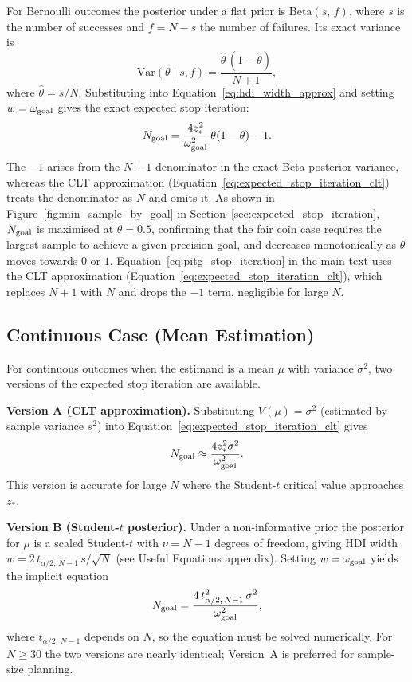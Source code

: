For Bernoulli outcomes the posterior under a flat prior is $\mathrm{Beta}(s,\,f)$,
where $s$ is the number of successes and $f = N - s$ the number of failures.
Its exact variance is
\[
\mathrm{Var}(\theta \mid s, f) = \frac{\hat\theta\,(1-\hat\theta)}{N+1},
\]
where $\hat\theta = s/N$. Substituting into Equation~\ref{eq:hdi_width_approx}
and setting $w = \omega_{\rm goal}$ gives the exact expected stop iteration:
\begin{equation}\label{eq:expected_stop_iteration_binomial}
N_{\rm goal} = \frac{4 z_{*}^{2}}{\omega_{\rm goal}^{2}}\,\theta(1-\theta) - 1.
\end{equation}
The $-1$ arises from the $N+1$ denominator in the exact Beta posterior variance,
whereas the CLT approximation (Equation~\ref{eq:expected_stop_iteration_clt})
treats the denominator as $N$ and omits it.
As shown in Figure~\ref{fig:min_sample_by_goal} in Section~\ref{sec:expected_stop_iteration},
$N_{\rm goal}$ is maximised at $\theta=0.5$, confirming that the fair coin case requires the
largest sample to achieve a given precision goal, and decreases monotonically as
$\theta$ moves towards $0$ or $1$.
Equation~\ref{eq:pitg_stop_iteration} in the main text uses the CLT approximation
(Equation~\ref{eq:expected_stop_iteration_clt}), which replaces $N+1$ with $N$ and
drops the $-1$ term, negligible for large $N$.


\subsection*{Continuous Case (Mean Estimation)}

For continuous outcomes when the estimand is a mean $\mu$ with variance $\sigma^{2}$,
two versions of the expected stop iteration are available.

\textbf{Version A (CLT approximation).}
Substituting $V(\mu)=\sigma^{2}$ (estimated by sample variance $s^2$) into
Equation~\ref{eq:expected_stop_iteration_clt} gives
\begin{equation}\label{eq:expected_stop_iteration_mean}
N_{\rm goal} \approx \frac{4 z_{*}^{2}\sigma^{2}}{\omega_{\rm goal}^{2}}.
\end{equation}
This version is accurate for large $N$ where the Student-$t$ critical value
approaches $z_{*}$.

\textbf{Version B (Student-$t$ posterior).}
Under a non-informative prior the posterior for $\mu$ is a scaled Student-$t$
with $\nu = N-1$ degrees of freedom, giving HDI width
$w = 2\,t_{\alpha/2,\,N-1}\,s/\!\sqrt{N}$ (see Useful Equations appendix).
Setting $w = \omega_{\rm goal}$ yields the implicit equation
\begin{equation}\label{eq:expected_stop_iteration_mean_t}
N_{\rm goal} = \frac{4\,t_{\alpha/2,\,N-1}^{2}\,\sigma^{2}}{\omega_{\rm goal}^{2}},
\end{equation}
where $t_{\alpha/2,\,N-1}$ depends on $N$, so the equation must be solved
numerically. For $N \ge 30$ the two versions are nearly identical; Version~A
is preferred for sample-size planning.

